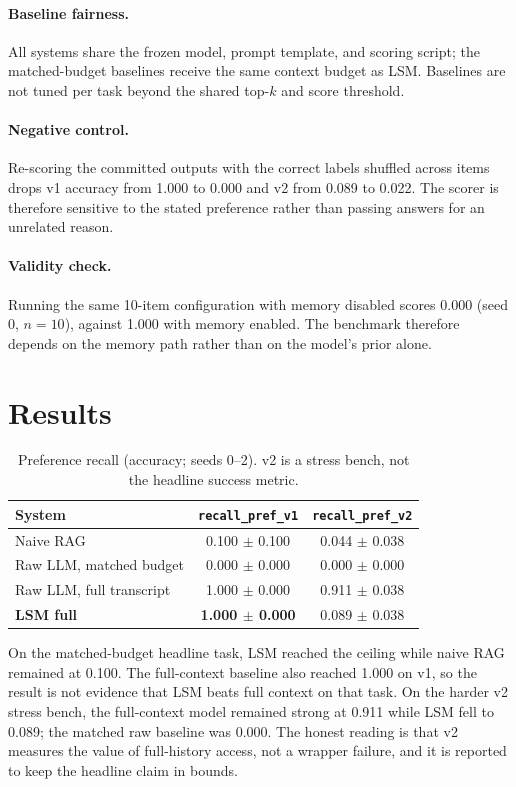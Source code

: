 \documentclass[11pt]{article}
\begin{document}
\paragraph{Baseline fairness.}
All systems share the frozen model, prompt template, and scoring script; the matched-budget baselines receive the same context budget as LSM. Baselines are not tuned per task beyond the shared top-$k$ and score threshold.

\paragraph{Negative control.}
Re-scoring the committed outputs with the correct labels shuffled across items drops v1 accuracy from 1.000 to 0.000 and v2 from 0.089 to 0.022. The scorer is therefore sensitive to the stated preference rather than passing answers for an unrelated reason.

\paragraph{Validity check.}
Running the same 10-item configuration with memory disabled scores 0.000 (seed 0, $n=10$), against 1.000 with memory enabled. The benchmark therefore depends on the memory path rather than on the model's prior alone.

\section{Results}

\begin{table}[t]
\centering
\small
\caption{Preference recall (accuracy; seeds 0--2). v2 is a stress bench, not the headline success metric.}
\label{tab:headline}
\begin{tabular}{lcc}
\toprule
System & \texttt{recall\_pref\_v1} & \texttt{recall\_pref\_v2} \\
\midrule
Naive RAG & 0.100 $\pm$ 0.100 & 0.044 $\pm$ 0.038 \\
Raw LLM, matched budget & 0.000 $\pm$ 0.000 & 0.000 $\pm$ 0.000 \\
Raw LLM, full transcript & 1.000 $\pm$ 0.000 & 0.911 $\pm$ 0.038 \\
\textbf{LSM full} & \textbf{1.000 $\pm$ 0.000} & 0.089 $\pm$ 0.038 \\
\bottomrule
\end{tabular}
\end{table}

On the matched-budget headline task, LSM reached the ceiling while naive RAG remained at 0.100. The full-context baseline also reached 1.000 on v1, so the result is not evidence that LSM beats full context on that task. On the harder v2 stress bench, the full-context model remained strong at 0.911 while LSM fell to 0.089; the matched raw baseline was 0.000. The honest reading is that v2 measures the value of full-history access, not a wrapper failure, and it is reported to keep the headline claim in bounds.
\end{document}

